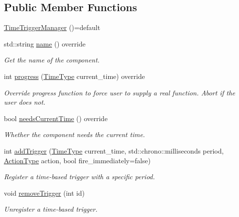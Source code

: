 \subsection*{Public Member Functions}
\begin{DoxyCompactItemize}
\item 
\hyperlink{structvt_1_1timetrigger_1_1_time_trigger_manager_a5739a97e0a8c7a19943d030a04e63a35}{Time\+Trigger\+Manager} ()=default
\item 
std\+::string \hyperlink{structvt_1_1timetrigger_1_1_time_trigger_manager_a8eba6c4f2596f9f8a6ad374ac020c8f4}{name} () override
\begin{DoxyCompactList}\small\item\em Get the name of the component. \end{DoxyCompactList}\item 
int \hyperlink{structvt_1_1timetrigger_1_1_time_trigger_manager_a15cc796e1f07dbf32c04b3fb3f3ce06c}{progress} (\hyperlink{namespacevt_a2b9f28078dc309ad0706b69ded743e69}{Time\+Type} current\+\_\+time) override
\begin{DoxyCompactList}\small\item\em Override progress function to force user to supply a real function. Abort if the user does not. \end{DoxyCompactList}\item 
bool \hyperlink{structvt_1_1timetrigger_1_1_time_trigger_manager_a2e65cfcbbbb1224b08263996b0fb1eff}{needs\+Current\+Time} () override
\begin{DoxyCompactList}\small\item\em Whether the component needs the current time. \end{DoxyCompactList}\item 
int \hyperlink{structvt_1_1timetrigger_1_1_time_trigger_manager_a42729a0a83f734dad3ef6d95b5afb3d9}{add\+Trigger} (\hyperlink{namespacevt_a2b9f28078dc309ad0706b69ded743e69}{Time\+Type} current\+\_\+time, std\+::chrono\+::milliseconds period, \hyperlink{namespacevt_ae0a5a7b18cc99d7b732cb4d44f46b0f3}{Action\+Type} action, bool fire\+\_\+immediately=false)
\begin{DoxyCompactList}\small\item\em Register a time-\/based trigger with a specific period. \end{DoxyCompactList}\item 
void \hyperlink{structvt_1_1timetrigger_1_1_time_trigger_manager_ae6bdddd787aa88b714686270587e1ff5}{remove\+Trigger} (int id)
\begin{DoxyCompactList}\small\item\em Unregister a time-\/based trigger. \end{DoxyCompactList}\item 

\end{DoxyCompactItemize}
